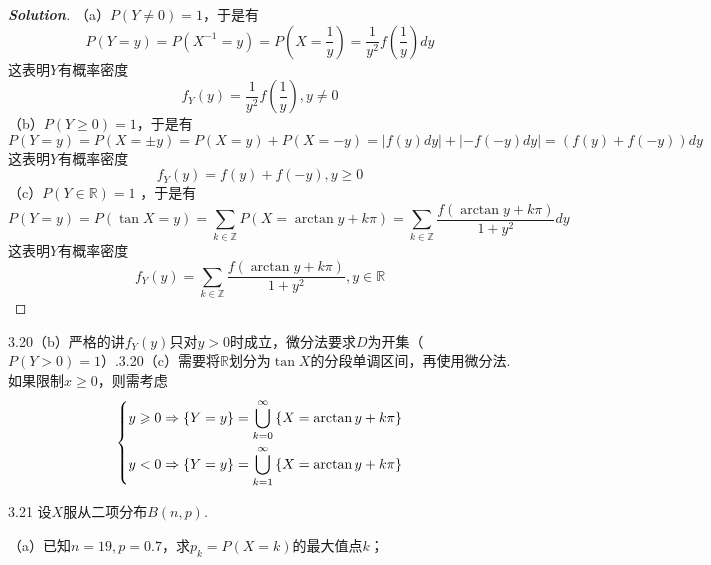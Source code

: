 \documentclass[10pt, a4paper, oneside]{ctexart}
\newenvironment{solution}{\begin{proof}[\bf Solution]}{\end{proof}}
\begin{document}
\begin{solution}

（a）$P(Y\ne 0)=1$，于是有
    \[P(Y=y)=P(X^{-1}=y)=P(X=\frac{1}{y})=\frac{1}{y^2}f(\frac{1}{y})dy\]
这表明$Y$有概率密度
\[{f_Y}(y) = \frac{1}{{{y^2}}}f(\frac{1}{y}),y \ne 0\]
（b）$P(Y\geqslant 0)=1$，于是有
\[P(Y = y) = P(X =  \pm y) = P(X = y) + P(X =  - y) = \left| {f(y)dy} \right| + \left| { - f( - y)dy} \right| = \left( {f(y) + f( - y)} \right)dy\]
    这表明$Y$有概率密度
\[{f_Y}(y) = f(y) + f( - y),y \geqslant 0\]
（c）$P(Y\in \mathbb{R})=1$ ，于是有
    \[P(Y = y) = P(\tan X = y) = \sum\limits_{k \in \mathbb{Z}} {P(X = \arctan y + k\pi )}  = \sum\limits_{k \in \mathbb{Z}} {\frac{{f(\arctan y + k\pi )}}{{1 + {y^2}}}} dy\]
    这表明$Y$有概率密度
\[{f_Y}(y) = \sum\limits_{k \in \mathbb{Z}} {\frac{{f(\arctan y + k\pi )}}{{1 + {y^2}}}} ,y \in \mathbb{R}\]
\end{solution}
\begin{remark}
3.20（b）严格的讲$f_Y(y)$只对$y>0$时成立，微分法要求$D$为开集（$P(Y>0)=1$）.3.20（c）需要将$\mathbb{R}$划分为$\tan X$的分段单调区间，再使用微分法.如果限制$x\geqslant 0$，则需考虑
\[\left\{ \begin{gathered}
  y \geqslant 0 \Rightarrow \left\{ {Y = y} \right\} = \bigcup\limits_{k = 0}^\infty  {\left\{ {X = \arctan y + k\pi } \right\}}  \hfill \\
  y < 0 \Rightarrow \left\{ {Y = y} \right\} = \bigcup\limits_{k = 1}^\infty  {\left\{ {X = \arctan y + k\pi } \right\}}  \hfill \\ 
\end{gathered}  \right.\]
\end{remark}

3.21 设$X$服从二项分布$B(n,p)$.

（a）已知$n=19,p=0.7$，求$p_k=P(X=k)$的最大值点$k$；
\end{document}
